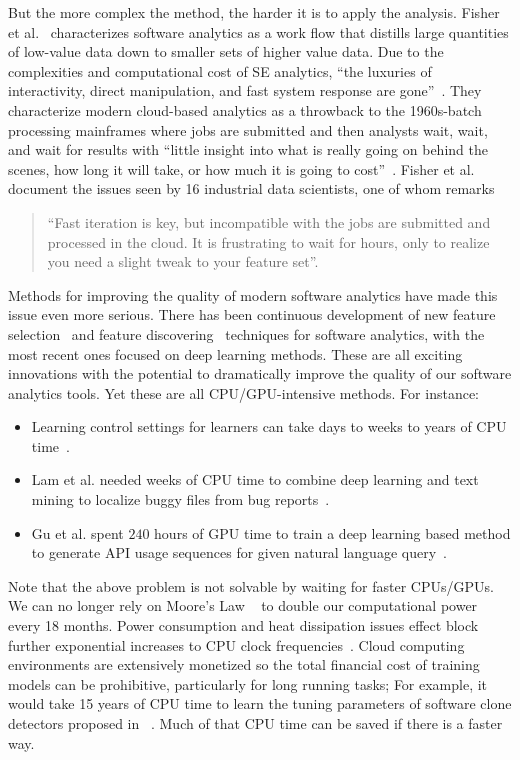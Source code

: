 \documentclass[sigconf,review, anonymous]{acmart}
\theoremstyle{break}
\newcommand{\bi}{\begin{itemize}[leftmargin=0.4cm]}
\newcommand{\ei}{\end{itemize}}
\begin{document}
But the more complex the  method,
the harder it is to apply the analysis.
Fisher et al.~\cite{fisher2012interactions} characterizes software analytics as a work flow that distills large quantities of low-value data down to smaller sets of higher value data. Due to the complexities and computational cost of SE analytics, ``the luxuries of interactivity, direct manipulation, and fast system response are gone''~\cite{fisher2012interactions}. They characterize modern cloud-based analytics as a throwback to the 1960s-batch processing mainframes where jobs are submitted and then analysts wait, wait, and wait for results with ``little insight into what is really going on behind the scenes, how long it will take, or how much it is going to cost''~\cite{fisher2012interactions}. Fisher et al. ~\cite{fisher2012interactions} document the issues seen by 16 industrial data scientists, one of whom remarks \begin{quote}
``Fast iteration is key, but incompatible with the jobs are submitted and processed in the cloud. It is frustrating to wait for hours, only to realize you need a slight tweak to your feature set''.
\end{quote}

Methods for improving the quality of modern software analytics have made this issue even more serious. There has been continuous development of new feature selection~\cite{hall2003benchmarking} and feature discovering~\cite{jiang2013personalized} techniques for software analytics, with the most recent ones focused on deep learning methods. These are all exciting innovations with the potential to dramatically improve the quality of our software analytics tools. Yet these are all CPU/GPU-intensive methods. For instance:
\bi
\item Learning control settings for learners can take days to weeks to years of CPU time~\cite{fu2016differential,tantithamthavorn2016automated,wang2013searching}.
\item Lam et al. needed weeks of CPU time to combine deep learning and text mining to localize buggy
files from bug reports~\cite{lam2015combining}.
\item Gu et al. spent $240$ hours of GPU time  to train a deep learning based method to generate API usage sequences for given natural language query~\cite{gu2016deep}. 
\ei 
Note that the above problem is not solvable by waiting for faster CPUs/GPUs. We 
can no longer rely on Moore's Law ~\cite{moore1998cramming} to double our computational power every 18 months. Power consumption and heat dissipation issues effect block further exponential increases to CPU clock frequencies~\cite{kumar2003single}. Cloud computing environments are extensively monetized so the total financial cost of training models can be prohibitive, particularly for long running tasks; For example, it would take 15 years of CPU time to learn the tuning parameters of software clone detectors proposed in ~\cite{wang2013searching}. Much of that CPU time can be saved if there is a faster  way.
\end{document}
